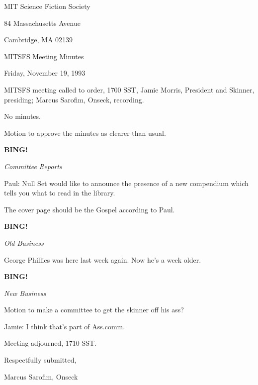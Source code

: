 \documentclass[12pt]{article}
\newcommand{\bing}{{\bf BING!} }
\newcommand{\goto}[1]{\bing \vskip 12pt \centerline{{\em{#1}}}}
\begin{document}
\begin{center}

MIT Science Fiction Society 

84 Massachusetts Avenue

Cambridge, MA 02139

\vspace{12pt}

MITSFS Meeting Minutes 

Friday, November 19, 1993

\end{center}
 
\vspace{18pt}

\setlength{\parskip}{6pt}

\noindent
MITSFS meeting called to order, 1700 SST,
Jamie Morris, President and Skinner, presiding; Marcus Sarofim, Onseck, recording.

No minutes.

Motion to approve the minutes as clearer than usual.

\goto{Committee Reports}

Paul: Null Set would like to announce the presence of a new compendium which tells you what to read in the library.

The cover page should be the Gospel according to Paul.

\goto{Old Business}

George Phillies was here last week again. Now he's a week older.

\goto{New Business}

Motion to make a committee to get the skinner off his ass?

Jamie: I think that's part of Ass.comm.

\vspace{12pt}

\noindent
Meeting adjourned, 1710 SST.

\vspace{18pt}

\centerline{Respectfully submitted,}
\centerline{Marcus Sarofim, Onseck}
\end{document}
